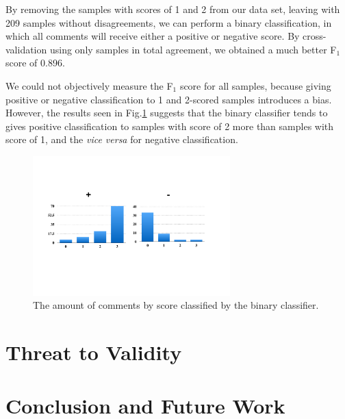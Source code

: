 \documentclass[conference]{IEEEtran}
\begin{document}

By removing the samples with scores of 1 and 2 from our data set, leaving with 209 samples without disagreements, we can perform a binary classification, in which all comments will receive either a positive or negative score.
By cross-validation using only samples in total agreement, we obtained a much better F$_1$ score of 0.896.

We could not objectively measure the F$_1$ score for all samples, because giving positive or negative classification to 1 and 2-scored samples introduces a bias.
However, the results seen in Fig.\ref{fig:binary} suggests that the binary classifier tends to gives positive classification to samples with score of 2 more than samples with score of 1, and the \emph{vice versa} for negative classification.

\begin{figure}[h]
\centering
\includegraphics[width=3in]{binary}
\caption{The amount of comments by score classified by the binary classifier.}
\label{fig:binary}
\end{figure}





\section{Threat to Validity}


\section{Conclusion and Future Work}


\IEEEpeerreviewmaketitle







\end{document}
